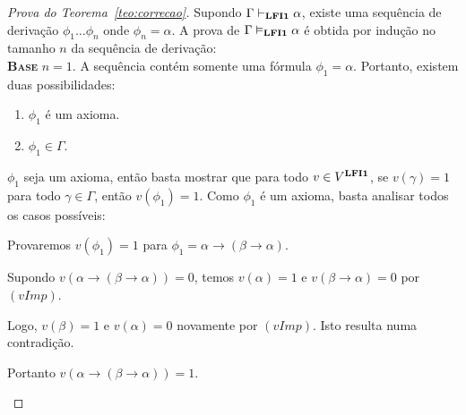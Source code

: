     \begin{proof}[Prova do Teorema~\ref{teo:correcao}]
        Supondo $\Gamma \vdash_{\textbf{LFI1}{}} \alpha$, existe uma sequência de derivação $\phi_{1} \ldots \phi_{n}$ onde $\phi_{n} = \alpha$. A prova de $\Gamma \vDash_{\textbf{LFI1}{}} \alpha$ é obtida por indução no tamanho $n$ da sequência de derivação:\\

        \noindent \textbf{\textsc{Base}} $n = 1$. A sequência contém somente uma fórmula $\phi_{1} = \alpha$. Portanto, existem duas possibilidades:
        \begin{enumerate}
            \item $\phi_{1}$ é um axioma.
            \item $\phi_{1} \in \Gamma$.
        \end{enumerate}
        

            \newcommand{\subcaso}{\refstepcounter{subcasosUm}\item[Subcaso 1.\thesubcasosUm{}.]}
        

        \begin{provaporcasos}
            
            \casodeprova $\phi_{1}$ seja um axioma, então basta mostrar que para todo $v \in V^{\textbf{LFI1}{}}$, se $v(\gamma) = 1$ para todo $\gamma \in \Gamma$, então $v(\phi_{1}) = 1$. Como $\phi_{1}$ é um axioma, basta analisar todos os casos possíveis:

            \begin{provaporsubcasos}
                
                \subcasodeprova Provaremos $v(\phi_{1}) = 1$ para $\phi_{1} = \alpha \to (\beta \to \alpha)$.

                    Supondo $v(\alpha \to (\beta \to \alpha)) = 0$, temos $v(\alpha) = 1$ e $v(\beta \to \alpha) = 0$ por $(vImp)$. 
                        
                    Logo, $v(\beta) = 1$ e $v(\alpha) = 0$ novamente por $(vImp)$. Isto resulta numa contradição. 
                    
                    Portanto $v(\alpha \to (\beta \to \alpha)) = 1$.


\end{provaporsubcasos}
\end{provaporcasos}
\end{proof}
